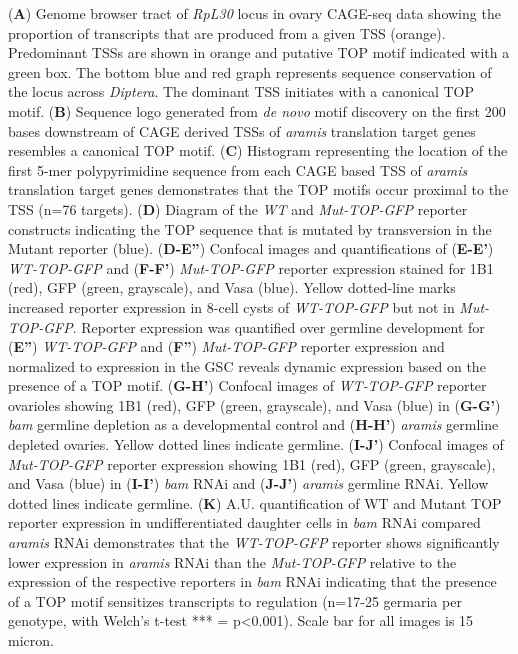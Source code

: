 \documentclass[12pt,oneside]{reedthesis}
\begin{document}
\textbf{\hfill\break
}

(\textbf{A}) Genome
browser tract of \emph{RpL30} locus in ovary CAGE-seq data showing the
proportion of transcripts that are produced from a given TSS (orange).
Predominant TSSs are shown in orange and putative TOP motif indicated
with a green box. The bottom blue and red graph represents sequence
conservation of the locus across \emph{Diptera}. The dominant TSS initiates
with a canonical TOP motif. (\textbf{B}) Sequence logo generated from \emph{de
novo} motif discovery on the first 200 bases downstream of CAGE derived
TSSs of \emph{aramis} translation target genes resembles a canonical TOP
motif. (\textbf{C}) Histogram representing the location of the first 5-mer
polypyrimidine sequence from each CAGE based TSS of \emph{aramis} translation
target genes demonstrates that the TOP motifs occur proximal to the TSS
(n=76 targets). (\textbf{D}) Diagram of the \emph{WT} and \emph{Mut-TOP-GFP} reporter
constructs indicating the TOP sequence that is mutated by transversion
in the Mutant reporter (blue). (\textbf{D-E''}) Confocal images and
quantifications of (\textbf{E-E'}) \emph{WT-TOP-GFP} and (\textbf{F-F'}) \emph{Mut-TOP-GFP}
reporter expression stained for 1B1 (red), GFP (green, grayscale), and
Vasa (blue). Yellow dotted-line marks increased reporter expression in
8-cell cysts of \emph{WT-TOP-GFP} but not in \emph{Mut-TOP-GFP}. Reporter
expression was quantified over germline development for (\textbf{E''})
\emph{WT-TOP-GFP} and (\textbf{F''}) \emph{Mut-TOP-GFP} reporter expression and
normalized to expression in the GSC reveals dynamic expression based on
the presence of a TOP motif. (\textbf{G-H'}) Confocal images of \emph{WT-TOP-GFP}
reporter ovarioles showing 1B1 (red), GFP (green, grayscale), and Vasa
(blue) in (\textbf{G-G'}) \emph{bam} germline depletion as a developmental control
and (\textbf{H-H'}) \emph{aramis} germline depleted ovaries. Yellow dotted lines
indicate germline. (\textbf{I-J'}) Confocal images of \emph{Mut-TOP-GFP} reporter
expression showing 1B1 (red), GFP (green, grayscale), and Vasa (blue) in
(\textbf{I-I'}) \emph{bam} RNAi and (\textbf{J-J'}) \emph{aramis} germline RNAi. Yellow
dotted lines indicate germline. (\textbf{K}) A.U. quantification of WT and
Mutant TOP reporter expression in undifferentiated daughter cells in
\emph{bam} RNAi compared \emph{aramis} RNAi demonstrates that the \emph{WT-TOP-GFP}
reporter shows significantly lower expression in \emph{aramis} RNAi than the
\emph{Mut-TOP-GFP} relative to the expression of the respective reporters in
\emph{bam} RNAi indicating that the presence of a TOP motif sensitizes
transcripts to regulation (n=17-25 germaria per genotype, with Welch's
t-test *** = p\textless0.001). Scale bar for all images is 15 micron.
\end{document}
